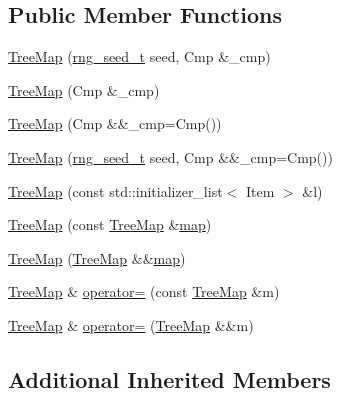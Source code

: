 \subsection*{Public Member Functions}
\begin{DoxyCompactItemize}
\item 
\hyperlink{class_designar_1_1_tree_map_a8f36580c132ec2cf3c1d4cd4ab8a4fa5}{Tree\+Map} (\hyperlink{namespace_designar_ad621b5646d45288c5d6a1e1dfe7531a8}{rng\+\_\+seed\+\_\+t} seed, Cmp \&\+\_\+cmp)
\item 
\hyperlink{class_designar_1_1_tree_map_ac0bcb95d2b1a18bd59c98ad89c3dc7a4}{Tree\+Map} (Cmp \&\+\_\+cmp)
\item 
\hyperlink{class_designar_1_1_tree_map_a10fa15275739543d0a7bc6470c0639dc}{Tree\+Map} (Cmp \&\&\+\_\+cmp=Cmp())
\item 
\hyperlink{class_designar_1_1_tree_map_a59cf2c9babbf20a9db85f133aa15dfd5}{Tree\+Map} (\hyperlink{namespace_designar_ad621b5646d45288c5d6a1e1dfe7531a8}{rng\+\_\+seed\+\_\+t} seed, Cmp \&\&\+\_\+cmp=Cmp())
\item 
\hyperlink{class_designar_1_1_tree_map_add7b0ee1ebafb7894771c14029e2aeca}{Tree\+Map} (const std\+::initializer\+\_\+list$<$ Item $>$ \&l)
\item 
\hyperlink{class_designar_1_1_tree_map_a5b71308661829869487a7c904a37fb09}{Tree\+Map} (const \hyperlink{class_designar_1_1_tree_map}{Tree\+Map} \&\hyperlink{class_designar_1_1_container_algorithms_a3b9044a197e4ceec6a1de03de197a293}{map})
\item 
\hyperlink{class_designar_1_1_tree_map_a8c281295a0099d65d21f56f5787a8dd9}{Tree\+Map} (\hyperlink{class_designar_1_1_tree_map}{Tree\+Map} \&\&\hyperlink{class_designar_1_1_container_algorithms_a3b9044a197e4ceec6a1de03de197a293}{map})
\item 
\hyperlink{class_designar_1_1_tree_map}{Tree\+Map} \& \hyperlink{class_designar_1_1_tree_map_a62214ac5be4a1d8d71e51e9b1a62d27a}{operator=} (const \hyperlink{class_designar_1_1_tree_map}{Tree\+Map} \&m)
\item 
\hyperlink{class_designar_1_1_tree_map}{Tree\+Map} \& \hyperlink{class_designar_1_1_tree_map_a0cf9ac62d56f4c4105d50aa8b730fd34}{operator=} (\hyperlink{class_designar_1_1_tree_map}{Tree\+Map} \&\&m)
\end{DoxyCompactItemize}
\subsection*{Additional Inherited Members}


